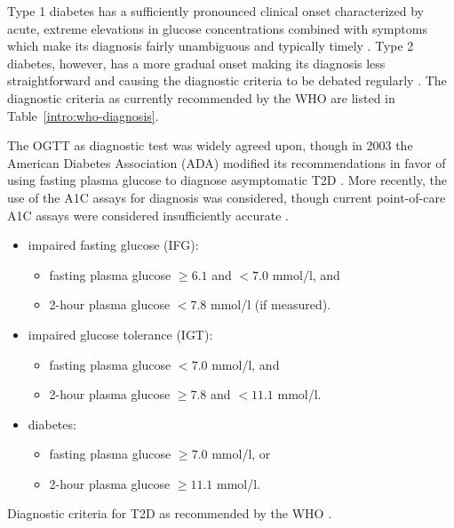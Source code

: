 Type 1 diabetes has a sufficiently pronounced clinical onset characterized by acute, extreme elevations in glucose concentrations combined with symptoms which make its diagnosis fairly unambiguous and typically timely \citep{international2009international}. Type 2 diabetes, however, has a more gradual onset making its diagnosis less straightforward and causing the diagnostic criteria to be debated regularly \citep{world2006definition, international2009international}.  The diagnostic criteria as currently recommended by the WHO are listed in Table~\ref{intro:who-diagnosis}.

The OGTT as diagnostic test was widely agreed upon, though in 2003 the American Diabetes Association (ADA) modified its recommendations in favor of using fasting plasma glucose to diagnose asymptomatic T2D \citep{world2006definition}. More recently, the use of the A1C assays for diagnosis was considered, though current point-of-care A1C assays were considered insufficiently accurate \citep{international2009international}.

\begin{table}[!h]
\colorbox{gray!20!white}{\parbox{\textwidth}{
\begin{itemize}
\item impaired fasting glucose (IFG):
\begin{itemize}
\item fasting plasma glucose $\geq 6.1$ and $< 7.0$ mmol/l, and
\item 2-hour plasma glucose $< 7.8$ mmol/l (if measured).
\end{itemize}
\item impaired glucose tolerance (IGT):
\begin{itemize}
\item fasting plasma glucose $< 7.0$ mmol/l, and
\item 2-hour plasma glucose $\geq 7.8$ and $< 11.1$ mmol/l.
\end{itemize}
\item diabetes:
\begin{itemize}
\item fasting plasma glucose $\geq 7.0$ mmol/l, or
\item 2-hour plasma glucose $\geq 11.1$ mmol/l.
\end{itemize}
\end{itemize}
}}
\caption{Diagnostic criteria for T2D as recommended by the WHO \citep{world2006definition}.} \label{intro:who-diagnosis}
\end{table}


